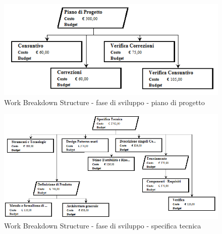 \documentclass[a4paper]{article}
\begin{document}
				\begin{figure}[H]
					\centering
					\includegraphics[width=\textwidth]{wbs/wbs_sviluppo_4}
					\caption{Work Breakdown Structure - fase di sviluppo - piano di progetto}
				\end{figure}
				\begin{figure}[H]
					\centering
					\includegraphics[width=\textwidth]{wbs/wbs_sviluppo_5}
					\caption{Work Breakdown Structure - fase di sviluppo - specifica tecnica}
				\end{figure}
\end{document}
